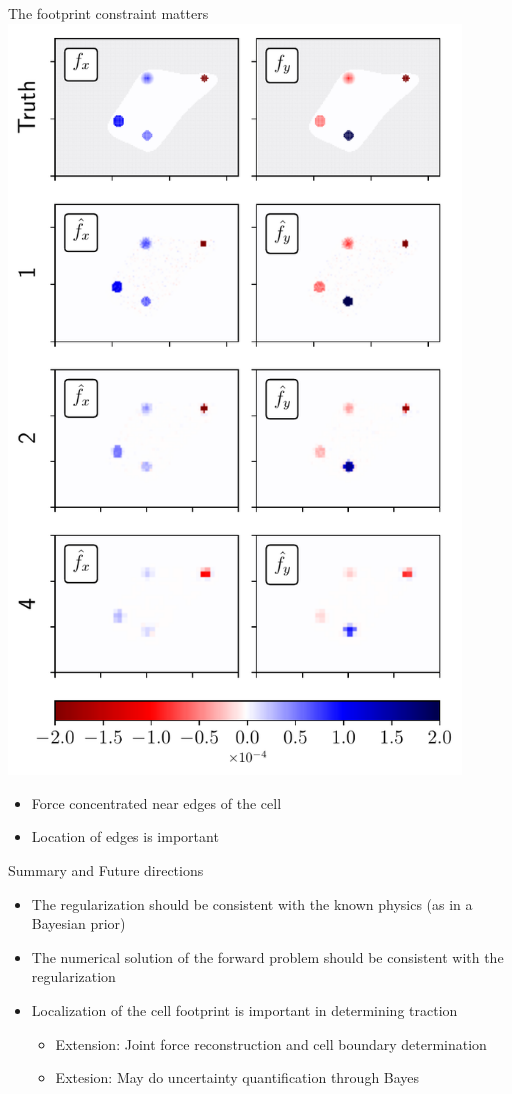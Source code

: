 \documentclass[presentation,aspectratio=169]{beamer}
\begin{document}
\begin{frame}{The footprint constraint matters}
\centering
\includegraphics[width=0.9\textwidth]{figures/fig4}
\begin{itemize}
\item Force concentrated near edges of the cell
\item Location of edges is important
\end{itemize}
\end{frame}

\begin{frame}{Summary and Future directions}
\begin{itemize}
\item The regularization should be consistent with the known physics (as in a Bayesian prior)
\item The numerical solution of the forward problem should be consistent with the regularization
\item Localization of the cell footprint is important in determining traction
\begin{itemize}
\item Extension: Joint force reconstruction and cell boundary determination
\item Extesion: May do uncertainty quantification through Bayes
\end{itemize}
\end{itemize}
\end{frame}
\end{document}
